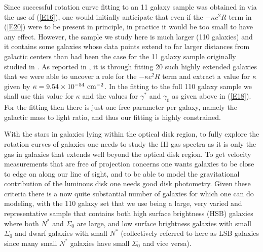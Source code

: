 \documentclass[preprint,aps]{revtex4}
\begin{document}
Since successful rotation curve fitting to an 11 galaxy sample was obtained in  \cite{Mannheim1997} via the use of  (\ref{E16}), one would initially anticipate that even if the $-\kappa c^2R$ term in (\ref{E20}) were to be present in principle, in practice it would be too small to have any effect. However, the sample we study here is much larger (110 galaxies) and it contains some galaxies whose data points extend to far larger distances from galactic centers than had been the case for the 11 galaxy sample originally studied in \cite{Mannheim1997}. As reported in \cite{Mannheim2010b}, it is through fitting 20 such highly extended galaxies that we were able to uncover a role for the $-\kappa c^2R$ term and extract a value for $\kappa $ given by $\kappa =9.54\times 10^{-54}~{\rm cm}^{-2}$. In the fitting to the full 110 galaxy sample we shall use this value for $\kappa$ and the values for $\gamma^*$ and $\gamma_0$ as given above in (\ref{E18}). For the fitting then there is just one free parameter per galaxy, namely the galactic mass to light ratio, and thus our fitting is highly constrained.

With the stars in galaxies lying within the optical disk region, to fully explore the rotation curves of galaxies one needs to study the HI gas spectra as it is only the gas in galaxies that extends well beyond the optical disk region. To get velocity measurements that are free of projection concerns one wants galaxies to be close to edge on along our line of sight, and to be able to model the gravitational contribution of the luminous disk one needs good disk photometry. Given these criteria there is a now quite substantial number of galaxies for which one can do modeling, with the 110 galaxy set that we use being a large, very varied and representative sample that contains both high surface brightness (HSB) galaxies where both $N^*$ and $\Sigma_0$ are large, and low surface brightness galaxies with small $\Sigma_0$ and dwarf galaxies with small $N^*$ (collectively referred to here as LSB galaxies since many small $N^*$ galaxies have small $\Sigma_0$ and vice versa).
\end{document}
